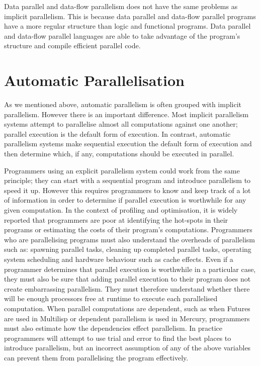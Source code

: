 Data parallel and data-flow parallelism does not have the same
problems as implicit parallelism.
This is because data parallel and data-flow parallel programs have a
more regular structure than logic and functional programs.
Data parallel and data-flow parallel languages are able to take
advantage of the program's structure and compile efficient parallel code.


\section{Automatic Parallelisation}
\label{sec:intro_auto_par}

As we mentioned above,
automatic parallelism is often grouped with implicit parallelism.
However there is an important difference.
Most implicit parallelism systems attempt to parallelise almost all
computations against one another;
parallel execution is the default form of execution.
In contrast,
automatic parallelism systems make sequential execution the default form
of execution and then determine which, if any, computations should be
executed in parallel.

Programmers using an explicit parallelism system could work from the
same principle;
they can start with a sequential program and introduce parallelism to
speed it up.
However this requires programmers to know and keep track of a lot of
information in order to determine if parallel execution is worthwhile
for any given computation.
In the context of profiling and optimisation,
it is widely reported that programmers are poor at identifying the
hot-spots in their programs or estimating the costs of their program's
computations.
Programmers who are parallelising programs must also understand the
overheads of parallelism such as:
spawning parallel tasks,
cleaning up completed parallel tasks,
operating system scheduling and
hardware behaviour such as cache effects.
Even if a programmer determines that parallel execution is worthwhile in
a particular case,
they must also be sure that adding parallel execution to their program
does not create embarrassing parallelism.
They must therefore understand whether there will be enough
processors free at runtime to execute each parallelised computation.
When parallel computations are dependent,
such as when Futures are used in Multilisp or
dependent parallelism is used in Mercury,
programmers must also estimate how the dependencies effect parallelism.
In practice programmers will attempt to use trial and error to find the
best places to introduce parallelism,
but an incorrect assumption of any of the above variables can prevent them
from parallelising the program effectively.

